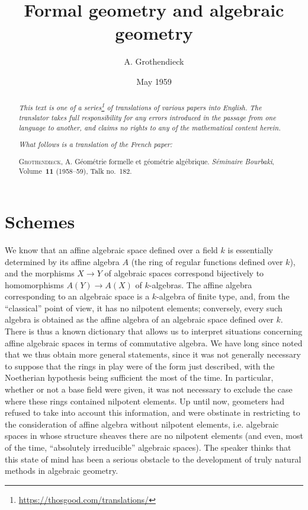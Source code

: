 \documentclass{article}
\title{Formal geometry and algebraic geometry}
\author{A. Grothendieck}
\date{May 1959}
\newcommand{\oldpage}[1]{\marginpar{\footnotesize$\Big\vert$ \textit{p.~#1}}}
\begin{document}
\maketitle
\thispagestyle{fancy}

\renewcommand{\abstractname}{Translator's note.}

\begin{abstract}
  \renewcommand*{\thefootnote}{\fnsymbol{footnote}}
  \emph{This text is one of a series\footnote{\url{https://thosgood.com/translations/}} of translations of various papers into English.}
  \emph{The translator takes full responsibility for any errors introduced in the passage from one language to another, and claims no rights to any of the mathematical content herein.}
  
  \emph{What follows is a translation of the French paper:}

  \medskip\noindent
  \textsc{Grothendieck, A.}
  G\'{e}om\'{e}trie formelle et g\'{e}om\'{e}trie alg\'{e}brique.
  \emph{S\'{e}minaire Bourbaki}, Volume~\textbf{11} (1958--59), Talk no.~182.
\end{abstract}

\setcounter{footnote}{0}

\tableofcontents
\bigskip



\section{Schemes}
\label{section1}

\oldpage{182-01}
We know that an affine algebraic space defined over a field $k$ is essentially determined by its affine algebra $A$ (the ring of regular functions defined over $k$), and the morphisms $X\to Y$ of algebraic spaces correspond bijectively to homomorphisms $A(Y)\to A(X)$ of $k$-algebras.
The affine algebra corresponding to an algebraic space is a $k$-algebra of finite type, and, from the ``classical'' point of view, it has no nilpotent elements;
conversely, every such algebra is obtained as the affine algebra of an algebraic space defined over $k$.
There is thus a known dictionary that allows us to interpret situations concerning affine algebraic spaces in terms of commutative algebra.
We have long since noted that we thus obtain more general statements, since it was not generally necessary to suppose that the rings in play were of the form just described, with the Noetherian hypothesis being sufficient the most of the time.
In particular, whether or not a base field were given, it was not necessary to exclude the case where these rings contained nilpotent elements.
Up until now, geometers had refused to take into account this information, and were obstinate in restricting to the consideration of affine algebra without nilpotent elements, i.e. algebraic spaces in whose structure sheaves there are no nilpotent elements (and even, most of the time, ``absolutely irreducible'' algebraic spaces).
The speaker thinks that this state of mind has been a serious obstacle to the development of truly natural methods in algebraic geometry.
\end{document}
